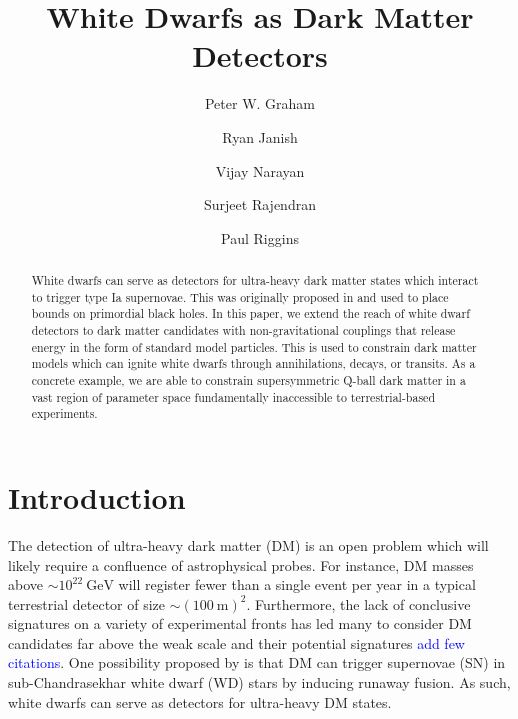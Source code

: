 \documentclass[twocolumn,showpacs,preprintnumbers,amsmath,amssymb,prd]{revtex4}
\newcommand{\GeV}{\text{GeV}}
\begin{document}
\title{White Dwarfs as Dark Matter Detectors}

\author{Peter W. Graham}

\author{Ryan Janish}

\author{Vijay Narayan}

\author{Surjeet Rajendran}

\author{Paul Riggins}

\begin{abstract}

White dwarfs can serve as detectors for ultra-heavy dark matter states which interact to trigger type Ia supernovae.
This was originally proposed in \cite{Graham:2015apa} and used to place bounds on primordial black holes.
In this paper, we extend the reach of white dwarf detectors to dark matter candidates with non-gravitational couplings that release energy in the form of standard model particles.
This is used to constrain dark matter models which can ignite white dwarfs through annihilations, decays, or transits.
As a concrete example, we are able to constrain supersymmetric Q-ball dark matter in a vast region of parameter space fundamentally inaccessible to terrestrial-based experiments.


\end{abstract}
\maketitle

\section{Introduction}
\label{sec:Introduction}

The detection of ultra-heavy dark matter (DM) is an open problem which will likely require a confluence of astrophysical probes.
For instance, DM masses above $\sim 10^{22} ~\GeV$ will register fewer than a single event per year in a typical terrestrial detector of size $\sim (100 ~\text{m})^2$.
Furthermore, the lack of conclusive signatures on a variety of experimental fronts has led many to consider DM candidates far above the weak scale and their potential signatures \textcolor{blue}{add few citations}.
One possibility proposed by \cite{Graham:2015apa} is that DM can trigger supernovae (SN) in sub-Chandrasekhar white dwarf (WD) stars by inducing runaway fusion.
As such, white dwarfs can serve as detectors for ultra-heavy DM states.
\end{document}
